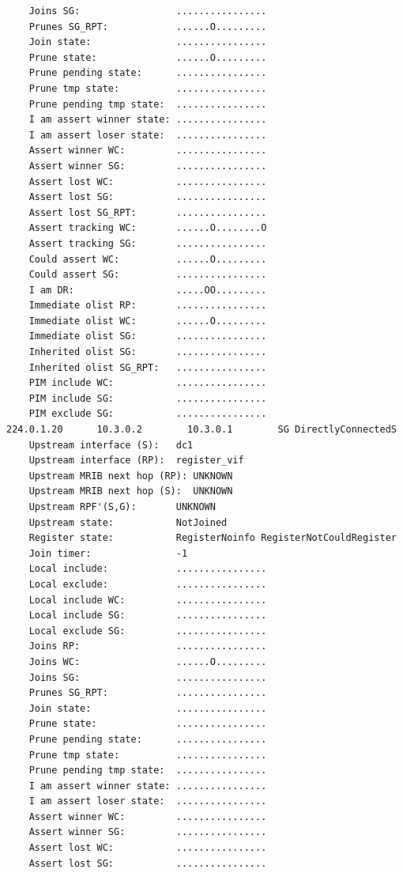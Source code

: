 \documentclass[11pt]{report}
\begin{document}
\begin{itemize}
\begin{verbatim}
    Joins SG:                 ................
    Prunes SG_RPT:            ......O.........
    Join state:               ................
    Prune state:              ......O.........
    Prune pending state:      ................
    Prune tmp state:          ................
    Prune pending tmp state:  ................
    I am assert winner state: ................
    I am assert loser state:  ................
    Assert winner WC:         ................
    Assert winner SG:         ................
    Assert lost WC:           ................
    Assert lost SG:           ................
    Assert lost SG_RPT:       ................
    Assert tracking WC:       ......O........O
    Assert tracking SG:       ................
    Could assert WC:          ......O.........
    Could assert SG:          ................
    I am DR:                  .....OO.........
    Immediate olist RP:       ................
    Immediate olist WC:       ......O.........
    Immediate olist SG:       ................
    Inherited olist SG:       ................
    Inherited olist SG_RPT:   ................
    PIM include WC:           ................
    PIM include SG:           ................
    PIM exclude SG:           ................
224.0.1.20      10.3.0.2        10.3.0.1        SG DirectlyConnectedS 
    Upstream interface (S):   dc1
    Upstream interface (RP):  register_vif
    Upstream MRIB next hop (RP): UNKNOWN
    Upstream MRIB next hop (S):  UNKNOWN
    Upstream RPF'(S,G):       UNKNOWN
    Upstream state:           NotJoined 
    Register state:           RegisterNoinfo RegisterNotCouldRegister 
    Join timer:               -1
    Local include:            ................
    Local exclude:            ................
    Local include WC:         ................
    Local include SG:         ................
    Local exclude SG:         ................
    Joins RP:                 ................
    Joins WC:                 ......O.........
    Joins SG:                 ................
    Prunes SG_RPT:            ................
    Join state:               ................
    Prune state:              ................
    Prune pending state:      ................
    Prune tmp state:          ................
    Prune pending tmp state:  ................
    I am assert winner state: ................
    I am assert loser state:  ................
    Assert winner WC:         ................
    Assert winner SG:         ................
    Assert lost WC:           ................
    Assert lost SG:           ................

\end{verbatim}
\end{itemize}
\end{document}
